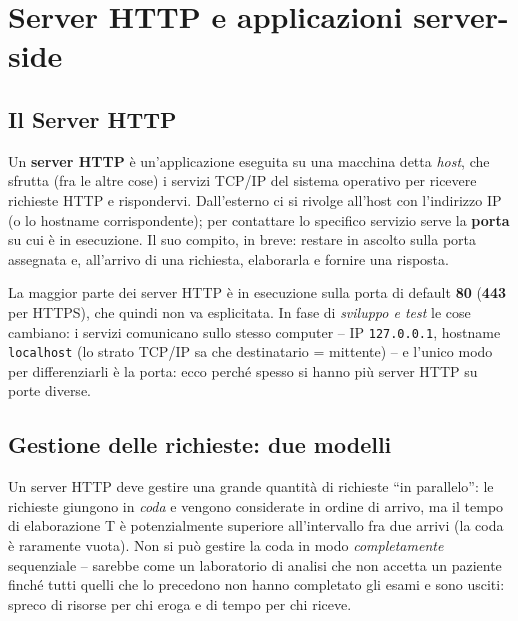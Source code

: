 \chapter{Server HTTP e applicazioni server-side}

\section{Il Server HTTP}

\begin{definizione}
Un \textbf{server HTTP} \`e un'applicazione eseguita su una macchina detta \emph{host}, che
sfrutta (fra le altre cose) i servizi TCP/IP del sistema operativo per ricevere richieste
HTTP e rispondervi. Dall'esterno ci si rivolge all'host con l'indirizzo IP (o lo hostname
corrispondente); per contattare lo specifico servizio serve la \textbf{porta} su cui \`e in
esecuzione. Il suo compito, in breve: restare in ascolto sulla porta assegnata e, all'arrivo
di una richiesta, elaborarla e fornire una risposta.
\end{definizione}

La maggior parte dei server HTTP \`e in esecuzione sulla porta di default \textbf{80}
(\textbf{443} per HTTPS), che quindi non va esplicitata. In fase di \emph{sviluppo e test} le
cose cambiano: i servizi comunicano sullo stesso computer -- IP \texttt{127.0.0.1}, hostname
\texttt{localhost} (lo strato TCP/IP sa che destinatario = mittente) -- e l'unico modo per
differenziarli \`e la porta: ecco perch\'e spesso si hanno pi\`u server HTTP su porte diverse.

\section{Gestione delle richieste: due modelli}

Un server HTTP deve gestire una grande quantit\`a di richieste ``in parallelo'': le richieste
giungono in \emph{coda} e vengono considerate in ordine di arrivo, ma il tempo di
elaborazione T \`e potenzialmente superiore all'intervallo fra due arrivi (la coda \`e
raramente vuota). Non si pu\`o gestire la coda in modo \emph{completamente} sequenziale --
sarebbe come un laboratorio di analisi che non accetta un paziente finch\'e tutti quelli che
lo precedono non hanno completato gli esami e sono usciti: spreco di risorse per chi eroga e
di tempo per chi riceve.

